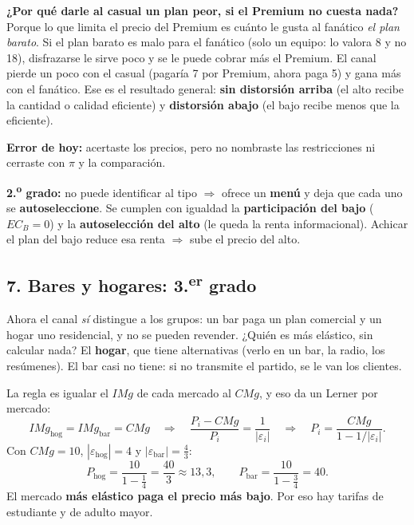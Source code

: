\documentclass[11pt]{article}
\begin{document}
\textbf{¿Por qué darle al casual un plan peor, si el Premium no cuesta nada?} Porque lo que limita el precio del Premium es cuánto le gusta al fanático \emph{el plan barato}. Si el plan barato es malo para el fanático (solo un equipo: lo valora 8 y no 18), disfrazarse le sirve poco y se le puede cobrar más el Premium. El canal pierde un poco con el casual (pagaría 7 por Premium, ahora paga 5) y gana más con el fanático. Ese es el resultado general: \textbf{sin distorsión arriba} (el alto recibe la cantidad o calidad eficiente) y \textbf{distorsión abajo} (el bajo recibe menos que la eficiente).

\begin{error}
\textbf{Error de hoy:} acertaste los precios, pero no nombraste las restricciones ni cerraste con $\pi$ y la comparación.
\end{error}
\begin{clave}
\textbf{2.\textsuperscript{o} grado:} no puede identificar al tipo $\Rightarrow$ ofrece un \textbf{menú} y deja que cada uno se \textbf{autoseleccione}. Se cumplen con igualdad la \textbf{participación del bajo} ($EC_B = 0$) y la \textbf{autoselección del alto} (le queda la renta informacional). Achicar el plan del bajo reduce esa renta $\Rightarrow$ sube el precio del alto.
\end{clave}

\subsection*{7. Bares y hogares: 3.\textsuperscript{er} grado}

Ahora el canal \emph{sí} distingue a los grupos: un bar paga un plan comercial y un hogar uno residencial, y no se pueden revender. ¿Quién es más elástico, sin calcular nada? El \textbf{hogar}, que tiene alternativas (verlo en un bar, la radio, los resúmenes). El bar casi no tiene: si no transmite el partido, se le van los clientes.

La regla es igualar el $IMg$ de cada mercado al $CMg$, y eso da un Lerner por mercado:
\[
IMg_{\text{hog}} = IMg_{\text{bar}} = CMg \quad\Longrightarrow\quad \frac{P_i - CMg}{P_i} = \frac{1}{|\varepsilon_i|} \quad\Longrightarrow\quad P_i = \frac{CMg}{1 - 1/|\varepsilon_i|}.
\]
Con $CMg = 10$, $|\varepsilon_{\text{hog}}| = 4$ y $|\varepsilon_{\text{bar}}| = \tfrac43$:
\[
P_{\text{hog}} = \frac{10}{1 - \tfrac14} = \frac{40}{3} \approx 13{,}3, \qquad P_{\text{bar}} = \frac{10}{1 - \tfrac34} = 40 .
\]
El mercado \textbf{más elástico paga el precio más bajo}. Por eso hay tarifas de estudiante y de adulto mayor.
\end{document}
